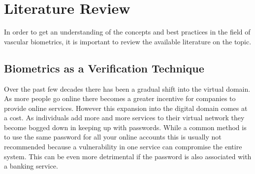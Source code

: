 \chapter{Literature Review}

In order to get an understanding of the concepts and best practices in the field of vascular biometrics, it is important to review the available literature on the topic.






\section{Biometrics as a Verification Technique}

Over the past few decades there has been a gradual shift into the virtual domain. As more people go online there becomes a greater incentive for companies to provide online services. However this expansion into the digital domain comes at a cost. As individuals add more and more services to their virtual network they become bogged down in keeping up with passwords. While a common method is to use the same password for all your online accounts this is usually not recommended because a vulnerability in one service can compromise the entire system. This can be even more detrimental if the password is also associated with a banking service.






